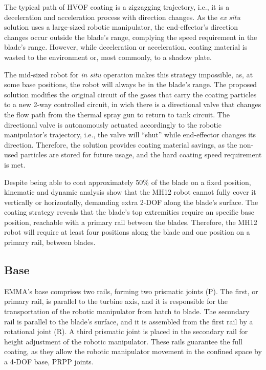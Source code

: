 The typical path of HVOF coating is a zigzagging trajectory,
i.e., it is a deceleration and acceleration process with direction changes. As
the \textit{ex situ} solution uses a large-sized robotic manipulator, the
end-effector's direction changes occur outside the blade's range, complying the
speed requirement in the blade's range. However, while deceleration or
acceleration, coating material is wasted to the environment or, most commonly,
to a shadow plate.

The mid-sized robot for \textit{in situ} operation makes this strategy
impossible, as, at some base positions, the robot will always be in the blade's
range. The proposed solution modifies the original circuit of the gases that
carry the coating particles to a new 2-way controlled circuit, in wich there is a directional
valve that changes the flow path from the thermal spray gun to return to tank
circuit. The directional valve is autonomously actuated accordingly to the robotic
manipulator's trajectory, i.e., the valve will ``shut'' while end-effector
changes its direction. Therefore, the solution provides coating material
savings, as the non-used particles are stored for future usage, and the hard
coating speed requirement is met.


Despite being able to coat approximately 50\% of the blade on a fixed
position, kinematic and dynamic analysis show that the MH12 robot cannot fully
cover it vertically or horizontally, demanding extra 2-DOF along the blade's
surface. The coating strategy reveals that the blade's top
extremities require an specific base position, reachable
with a primary rail between the blades. Therefore, the MH12 robot will require
at least four positions along the blade and one position on a primary
rail, between blades. 

\subsection{Base}

EMMA's base comprises two rails, forming two prismatic joints (P). The
first, or primary rail, is parallel to the turbine axis, and it is responsible
for the transportation of the robotic manipulator from hatch to blade. The
secondary rail is parallel to the blade's surface, and it is assembled from the
first rail by a rotational joint (R). A third prismatic joint
is placed in the secondary rail for height adjustment of the robotic
manipulator. These rails guarantee the full coating, as they allow the
robotic manipulator movement in the confined space by a 4-DOF base, PRPP joints.

